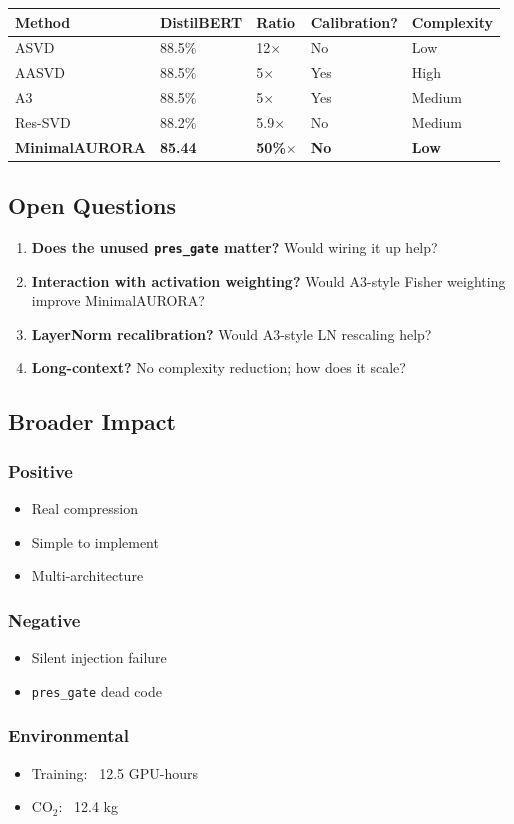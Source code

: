 \begin{table}[H]
\centering
\small
\begin{tabular}{lllll}
\toprule
\textbf{Method} & \textbf{DistilBERT} & \textbf{Ratio} & \textbf{Calibration?} & \textbf{Complexity} \\
\midrule
ASVD & 88.5\% & 12$\times$ & No & Low \\
AASVD & 88.5\% & 5$\times$ & Yes & High \\
A3 & 88.5\% & 5$\times$ & Yes & Medium \\
Res-SVD & 88.2\% & 5.9$\times$ & No & Medium \\
\textbf{MinimalAURORA} & \textbf{85.44} & \textbf{50\%$\times$} & \textbf{No} & \textbf{Low} \\
\bottomrule
\end{tabular}
\end{table}

\subsection{Open Questions}

\begin{enumerate}
\item \textbf{Does the unused \texttt{pres\_gate} matter?} Would wiring it up help?
\item \textbf{Interaction with activation weighting?} Would A3-style Fisher
  weighting improve MinimalAURORA?
\item \textbf{LayerNorm recalibration?} Would A3-style LN rescaling help?
\item \textbf{Long-context?} No complexity reduction; how does it scale?

\end{enumerate}
\subsection{Broader Impact}

\subsubsection{Positive}
\begin{itemize}
\item Real compression
\item Simple to implement
\item Multi-architecture

\end{itemize}
\subsubsection{Negative}
\begin{itemize}
\item Silent injection failure
\item \texttt{pres\_gate} dead code

\end{itemize}
\subsubsection{Environmental}
\begin{itemize}
\item Training: ~12.5 GPU-hours
\item CO$_2$: ~12.4 kg

\end{itemize}
